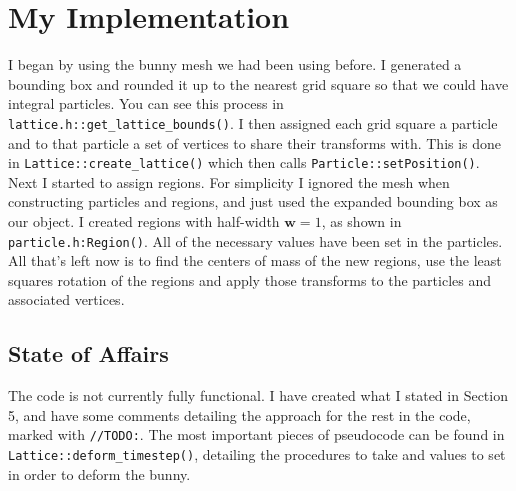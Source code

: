 \documentclass[12pt,a4paper]{amsart}
\begin{document}
	\section{My Implementation}
	I began by using the bunny mesh we had been using before. I generated a bounding box and rounded it up to the nearest grid square so that we could have integral particles. You can see this process in \texttt{lattice.h::get\_lattice\_bounds()}. I then assigned each grid square a particle and to that particle a set of vertices to share their transforms with. This is done in \texttt{Lattice::create\_lattice()} which then calls \texttt{Particle::setPosition()}. Next I started to assign regions. For simplicity I ignored the mesh when constructing particles and regions, and just used the expanded bounding box as our object. I created regions with half-width $\mathbf{w} = 1$, as shown in \texttt{particle.h:Region()}. All of the necessary values have been set in the particles. All that's left now is to find the centers of mass of the new regions, use the least squares rotation of the regions and apply those transforms to the particles and associated vertices.
	\subsection{State of Affairs}
	The code is not currently fully functional. I have created what I stated in Section 5, and have some comments detailing the approach for the rest in the code, marked with \texttt{//TODO:}. The most important pieces of pseudocode can be found in \texttt{Lattice::deform\_timestep()}, detailing the procedures to take and values to set in order to deform the bunny.
	
	
	
	
\end{document}
